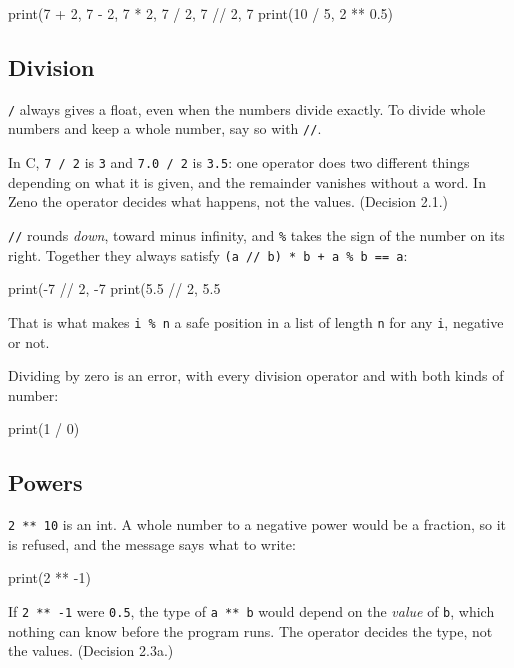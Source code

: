 \begin{zeno}
print(7 + 2, 7 - 2, 7 * 2, 7 / 2, 7 // 2, 7 %
print(10 / 5, 2 ** 0.5)
\end{zeno}

\subsection{Division}

\verb|/| always gives a float, even when the numbers divide exactly.
To divide whole numbers and keep a whole number, say so with
\verb|//|.

\begin{why}
In C, \verb|7 / 2| is \verb|3| and \verb|7.0 / 2| is \verb|3.5|: one
operator does two different things depending on what it is given, and
the remainder vanishes without a word. In Zeno the operator decides
what happens, not the values. (Decision 2.1.)
\end{why}

\verb|//| rounds \emph{down}, toward minus infinity, and \verb|%| takes
the sign of the number on its right. Together they always satisfy
\verb|(a // b) * b + a % b == a|:

\begin{zeno}
print(-7 // 2, -7 %
print(5.5 // 2, 5.5 %
\end{zeno}

That is what makes \verb|i % n| a safe position in a list of length
\verb|n| for any \verb|i|, negative or not.

Dividing by zero is an error, with every division operator and with
both kinds of number:

\begin{zeno}[fails=yes]
print(1 / 0)
\end{zeno}

\subsection{Powers}

\verb|2 ** 10| is an int. A whole number to a negative power would be
a fraction, so it is refused, and the message says what to write:

\begin{zeno}[fails=yes]
print(2 ** -1)
\end{zeno}

\begin{why}
If \verb|2 ** -1| were \verb|0.5|, the type of \verb|a ** b| would
depend on the \emph{value} of \verb|b|, which nothing can know before
the program runs. The operator decides the type, not the values.
(Decision 2.3a.)
\end{why}

